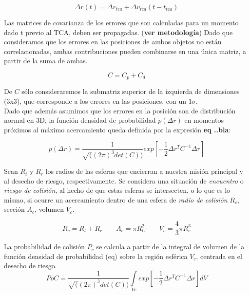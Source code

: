 \begin{equation}
\Delta r(t)=\Delta r_{tca}+\Delta v_{tca}(t-t_{tca})
\end{equation}

Las matrices de covarianza de los errores que son calculadas para un momento dado t previo al TCA, deben ser propagadas. ({\bf{ver metodolog\'ia}})
Dado que consideramos que los errores en las posiciones de ambos objetos no est\'an correlacionadas, ambas contribuciones pueden combinarse en una \'unica matriz, a partir de la suma de ambas.

\begin{equation}
C=C_{p}+C_{d}
\end{equation}

De $C$ s\'olo consideraremos la submatriz superior de la izquierda de dimensiones (3x3), que corresponde a los errores en las posiciones, con un $1 \sigma$.\\
Dado que adem\'as asumimos que los errores en la posici\'on son de distribuci\'on normal en 3D, la funci\'on densidad de probabilidad $p(\Delta r)$ en momentos pr\'oximos al m\'aximo acercamiento queda definida por la expresi\'on {\bf{eq ..bla}}:

\begin{equation}
p(\Delta r)=\frac{1}{\sqrt((2 \pi)^3det(C))} exp[-\frac{1}{2}\Delta r^TC^{-1}\Delta r]
\end{equation}

Sean $R_{t}$ y $R_{r}$ los radios de las esferas que encierran a nuestra misi\'on principal y al desecho de riesgo, respectivamente. Se considera una situaci\'on de {\it{encuentro}} o {\it{riesgo de colisi\'on}}, al hecho de que estas esferas se intersecten, o lo que es lo mismo, si ocurre un acercamiento dentro de una esfera de {\it{radio de colisi\'on}} $R_{c}$, secci\'on $A_{c}$,  volumen $V_{c}$.

\begin{equation}
R_{c}=R_{t}+R_{r} \qquad A_{c}=\pi R_{C}^{2} \qquad V_{c}=\frac{4}{3} \pi R_{c}^{3}
\end{equation}

La probabilidad de colisi\'on $P_{c}$ se calcula a partir de la integral de volumen de la funci\'on densidad de probabilidad (eq) sobre la regi\'on esf\'erica $V_{c}$, centrada en el desecho de riesgo.
\begin{equation}
PoC=\frac{1}{\sqrt((2\pi)^3det(C))} \int \limits_{Vc} exp[-\frac{1}{2}\Delta r^TC^{-1}\Delta r]dV
\label{eq:poc3d}
\end{equation}

